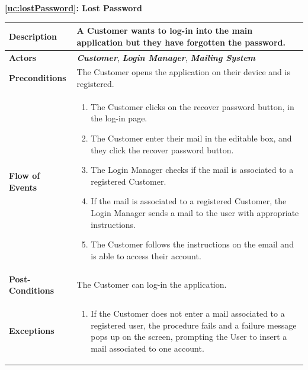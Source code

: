 \documentclass[a4paper, 12pt, oneside]{article}
\begin{document}
\newpage
\begin{center}
{\textbf{\ref{uc:lostPassword}: Lost Password}}
\end{center}
\begin{tabularx}{\linewidth}{| l | X |}
    
    \hline
    \textbf{Description} & A Customer wants to log-in into the main application but they have forgotten the password.\\
    

    \hline
    \textbf{Actors} & \textbf{\textit{Customer}}, \textit{\textbf{Login Manager}}, \textit{\textbf{Mailing System}} \\
    
    \hline
    \textbf{Preconditions} & The Customer opens the application on their device and is registered.\\
    
    \hline
    \textbf{Flow of Events} & \parbox{0.7\textwidth}{   
        \begin{enumerate}
            \item The Customer clicks on the recover password button, in the log-in page.
            \item The Customer enter their mail in the editable box, and they click the recover password button.
            \item The Login Manager checks if the mail is associated to a registered Customer.
            \item If the mail is associated to a registered Customer, the Login Manager sends a mail to the user with appropriate instructions.
            \item The Customer follows the instructions on the email and is able to access their account.
    \end{enumerate}}\\
    
    \hline
    \textbf{Post-Conditions} & The Customer can log-in the application.\\
    
    \hline
    \textbf{Exceptions} & \parbox{0.7\textwidth}{ \begin{enumerate}
            \item If the Customer does not enter a mail associated to a registered user, the procedure fails and a failure message pops up on the screen, prompting the User to insert a mail associated to one account.
        \end{enumerate}}\\

    \hline
    
\end{tabularx}
\end{document}
